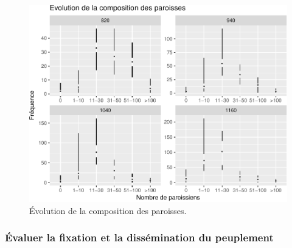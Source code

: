 \begin{figure}[H]
	\captionsetup{width=\linewidth}
	\includegraphics[width=\linewidth]{img/resultats/v0_compo_paroisses.pdf}
	\caption{Évolution de la composition des paroisses.} 
	\label{fig:compo-paroisses-v0} 
\end{figure}



\subsubsection{Évaluer la fixation et la dissémination du peuplement}



